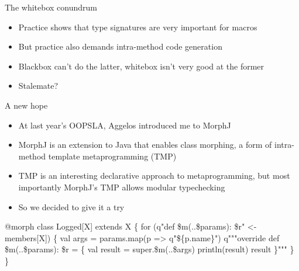 \documentclass[svgnames,dvipsnames,hyperref={bookmarks=false},usepdftitle=false]{beamer}
\begin{document}
\begin{frame}{The whitebox conundrum}
\begin{itemize}
\item Practice shows that type signatures are very important for macros
\item But practice also demands intra-method code generation
\item Blackbox can't do the latter, whitebox isn't very good at the former
\item Stalemate?
\end{itemize}
\end{frame}

\begin{frame}{A new hope}
\begin{itemize}
\item At last year's OOPSLA, Aggelos introduced me to MorphJ
\item MorphJ is an extension to Java that enables class morphing, a form of intra-method template metaprogramming (TMP)
\item TMP is an interesting declarative approach to metaprogramming, but most importantly MorphJ's TMP allows modular typechecking
\item So we decided to give it a try
\end{itemize}
\end{frame}


\begin{frame}[fragile]{}
\begin{semiverbatim}
\alert<1>{@morph}
class Logged[X] extends X \{
  \alert<2>{for (q"def \$m(..\$params): \$r" <- members[X]) \{}
    val args = params.map(p => q"\$\{p.name\}")
    q"""\alert<2,3>{override def \$m(..\$params): \$r} = \{
          val result = \alert<4>{super.\$m}(..\$args)
          \alert<4>{println}(result)
          result
        \}"""
  \}
\}

\end{semiverbatim}

\begin{itemize}
\end{itemize}
\end{frame}
\end{document}
